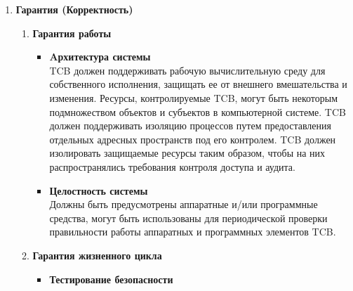 \begin{enumerate}
\begin{enumerate}
\begin{enumerate}
\begin{enumerate}
                удаление объектов, действия операторов и системных администраторов и/или сотрудников безопасности системы и другие события, связанные с безопасностью. Для каждого зарегистрированного
                события в журнале аудита должно быть указано: время и дата наступления события, пользователь, совершивший действие, тип события, результат события (успех/неудача). Для событий
                идентификации/аутентификации в журнале аудита должно быть указано происхождение запроса (\textit{прим. } кем инициировано событие) (\textit{напр.} идентификатор терминала). Для событий,
                вводящих объект в адресное пространство пользователя и удаляющих объект, запись в журнале аудита должна содержать имя объекта. Администратор системы должен иметь возможность выборочно
                проверять действия любого пользователя системы.
            \end{enumerate}
            \item{\textbf{Гарантия (Корректность)}}
            \begin{enumerate}
                \item{\textbf{Гарантия работы}}
                \begin{itemize}
                    \item{\textbf{Aрхитектура системы}}\\
                    TCB должен поддерживать рабочую вычислительную среду для собственного исполнения, защищать ее от внешнего вмешательства и изменения. Ресурсы, контролируемые TCB, могут быть
                    некоторым подмножеством объектов и субъектов в компьютерной системе. TCB должен поддерживать изоляцию процессов путем предоставления отдельных адресных пространств под его контролем.
                    TCB должен изолировать защищаемые ресурсы таким образом, чтобы на них распространялись требования контроля доступа и аудита.
                    \item{\textbf{Целостность системы}}\\
                    Должны быть предусмотрены аппаратные и/или программные средства, могут быть использованы для периодической проверки правильности работы аппаратных и программных элементов TCB.
                \end{itemize}
                \item{\textbf{Гарантия жизненного цикла}}
                \begin{itemize}
                    \item{\textbf{Тестирование безопасности}}\\

\end{itemize}
\end{enumerate}
\end{enumerate}
\end{enumerate}
\end{enumerate}
